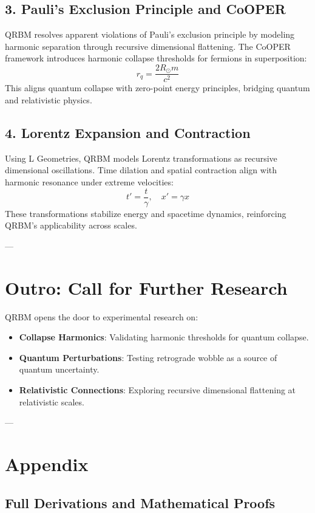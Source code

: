 \documentclass{article}
\begin{document}
\subsection*{3. Pauli’s Exclusion Principle and CoOPER}
QRBM resolves apparent violations of Pauli’s exclusion principle by modeling harmonic separation through recursive dimensional flattening. The CoOPER framework introduces harmonic collapse thresholds for fermions in superposition:
\[
r_q = \frac{2R_\odot m}{c^2}
\]
This aligns quantum collapse with zero-point energy principles, bridging quantum and relativistic physics.

\subsection*{4. Lorentz Expansion and Contraction}
Using L Geometries, QRBM models Lorentz transformations as recursive dimensional oscillations. Time dilation and spatial contraction align with harmonic resonance under extreme velocities:
\[
t' = \frac{t}{\gamma}, \quad x' = \gamma x
\]
These transformations stabilize energy and spacetime dynamics, reinforcing QRBM’s applicability across scales.

---

\section*{Outro: Call for Further Research}
QRBM opens the door to experimental research on:
\begin{itemize}
    \item \textbf{Collapse Harmonics}: Validating harmonic thresholds for quantum collapse.
    \item \textbf{Quantum Perturbations}: Testing retrograde wobble as a source of quantum uncertainty.
    \item \textbf{Relativistic Connections}: Exploring recursive dimensional flattening at relativistic scales.
\end{itemize}

---
\section*{Appendix}

\subsection*{Full Derivations and Mathematical Proofs}
\end{document}
